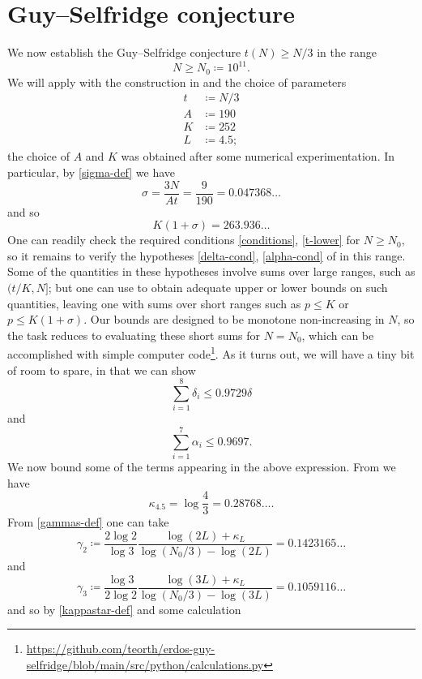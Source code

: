\documentclass[12pt,a4paper,reqno]{amsart}
\numberwithin{equation}{section}
\theoremstyle{plain}
\theoremstyle{definition}
\begin{document}
\section{Guy--Selfridge conjecture}

We now establish the Guy--Selfridge conjecture $t(N) \geq N/3$ in the range
$$ N \geq N_0 \coloneqq 10^{11}.$$
We will apply  with the construction in  and the choice of parameters
\begin{align*}
  t &\coloneqq N/3\\
  A &\coloneqq 190\\
  K &\coloneqq 252 \\
  L &\coloneqq 4.5;
\end{align*}
the choice of $A$ and $K$ was obtained after some numerical experimentation.  In particular, by \eqref{sigma-def} we have
$$ \sigma = \frac{3N}{At}=\frac{9}{190} =0.047368\dots$$
and so
$$ K(1+\sigma)=263.936\dots$$
One can readily check the required conditions \eqref{conditions}, \eqref{t-lower} for $N \geq N_0$, so it remains to verify the hypotheses \eqref{delta-cond}, \eqref{alpha-cond} of  in this range.  Some of the quantities in these hypotheses involve sums over large ranges, such as $(t/K,N]$; but one can use  to obtain adequate upper or lower bounds on such quantities, leaving one with sums over short ranges such as $p \leq K$ or $p \leq K(1+\sigma)$.  Our bounds are designed to be monotone non-increasing in $N$, so the task reduces to evaluating these short sums for $N=N_0$, which can be accomplished with simple computer code\footnote{\url{https://github.com/teorth/erdos-guy-selfridge/blob/main/src/python/calculations.py}}.   As it turns out, we will have a tiny bit of room to spare, in that we can show 
\begin{equation}\label{delta-final}
  \sum_{i=1}^8 \delta_i \leq 0.9729 \delta
\end{equation}
and 
\begin{equation}\label{alpha-final}
  \sum_{i=1}^7 \alpha_i \leq 0.9697.
\end{equation}
We now bound some of the terms appearing in the above expression. From  we have
$$ \kappa_{4.5} = \log \frac{4}{3} =0.28768\dots.$$
From \eqref{gammas-def} one can take
$$ \gamma_2 \coloneqq \frac{2 \log 2}{\log 3} \frac{\log(2L) + \kappa_L}{\log(N_0/3) - \log(2L)} = 0.1423165\dots$$
and
$$\gamma_3 \coloneqq \frac{\log 3}{2\log 2} \frac{\log(3L) + \kappa_L}{\log(N_0/3) - \log(3L)} =  0.1059116 \dots$$
and so by \eqref{kappastar-def} and some calculation
\end{document}

